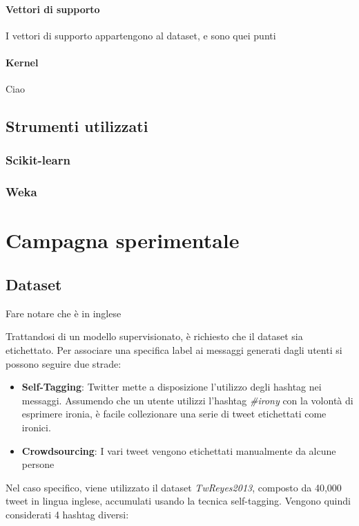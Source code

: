 \documentclass[oneside]{book}
\begin{document}
\subsubsection{Vettori di supporto}
I vettori di supporto appartengono al dataset, e sono quei punti 

\subsubsection{Kernel}
Ciao

\section{Strumenti utilizzati}
\subsection{Scikit-learn}
\subsection{Weka}




\chapter{Campagna sperimentale}

\section{Dataset}
Fare notare che è in inglese

Trattandosi di un modello supervisionato, è richiesto che il dataset sia etichettato. Per associare una specifica label ai messaggi generati dagli utenti si possono seguire due strade:

\begin{itemize}
	\item \textbf{Self-Tagging}:
	\label{chap:self-taggin}
	Twitter mette a disposizione l'utilizzo degli hashtag nei messaggi. Assumendo che un utente utilizzi l'hashtag \emph{\#irony} con la volontà di esprimere ironia, è facile collezionare una serie di tweet etichettati come ironici.
	
	\item \textbf{Crowdsourcing}:	
	I vari tweet vengono etichettati manualmente da alcune persone
\end{itemize}

Nel caso specifico, viene utilizzato il dataset \emph{TwReyes2013}, composto da 40,000 tweet in lingua inglese, accumulati usando la tecnica self-tagging. Vengono quindi considerati 4 hashtag diversi:
\end{document}
